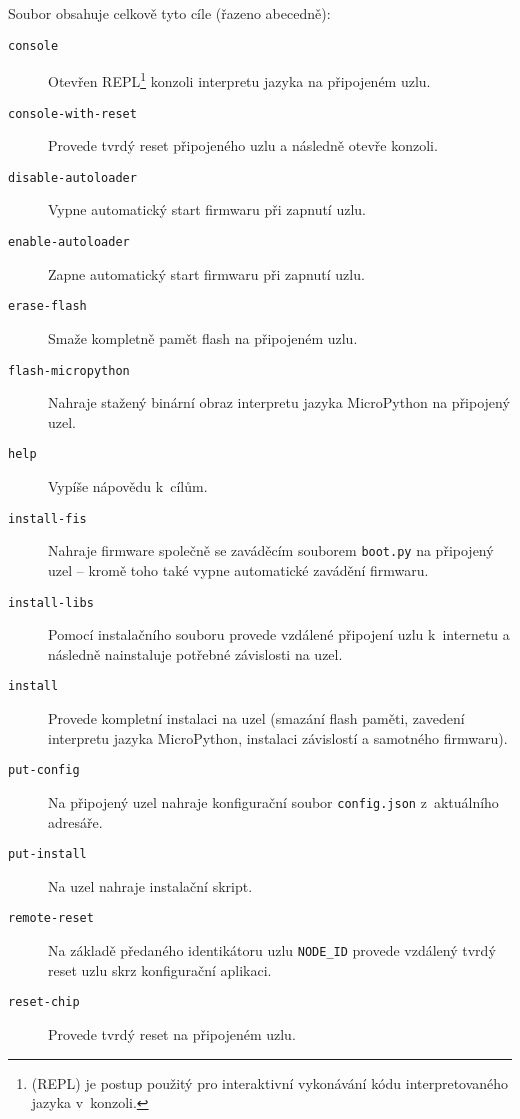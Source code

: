 Soubor  obsahuje celkově tyto cíle (řazeno abecedně):
\begin{description}
    \item[\texttt{console}] Otevřen REPL\footnote{ (REPL) je postup použitý pro
    interaktivní vykonávání kódu interpretovaného jazyka v~konzoli.} konzoli interpretu jazyka na připojeném uzlu.
    \item[\texttt{console-with-reset}] Provede tvrdý reset připojeného uzlu a následně otevře konzoli.
    \item[\texttt{disable-autoloader}] Vypne automatický start firmwaru při zapnutí uzlu.
    \item[\texttt{enable-autoloader}] Zapne automatický start firmwaru při zapnutí uzlu.
    \item[\texttt{erase-flash}] Smaže kompletně pamět flash na připojeném uzlu.
    \item[\texttt{flash-micropython}] Nahraje stažený binární obraz interpretu jazyka MicroPython na připojený uzel.
    \item[\texttt{help}] Vypíše nápovědu k~cílům.
    \item[\texttt{install-fis}] Nahraje firmware společně se zaváděcím souborem \texttt{boot.py} na připojený uzel --
    kromě toho také vypne automatické zavádění firmwaru.
    \item[\texttt{install-libs}] Pomocí instalačního souboru provede vzdálené připojení uzlu k~internetu a následně
    nainstaluje potřebné závislosti na uzel.
    \item[\texttt{install}] Provede kompletní instalaci na uzel (smazání flash paměti, zavedení interpretu jazyka
    MicroPython, instalaci závislostí a samotného firmwaru).
    \item[\texttt{put-config}] Na připojený uzel nahraje konfigurační soubor \texttt{config.json} z~aktuálního adresáře.
    \item[\texttt{put-install}] Na uzel nahraje instalační skript.
    \item[\texttt{remote-reset}] Na základě předaného identikátoru uzlu \texttt{NODE\_ID} provede vzdálený tvrdý
    reset uzlu skrz konfigurační aplikaci.
    \item[\texttt{reset-chip}] Provede tvrdý reset na připojeném uzlu.
\end{description}
